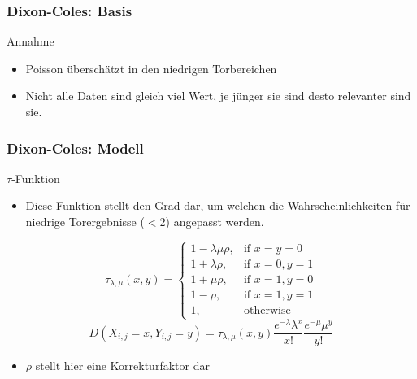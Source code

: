 \documentclass{beamer}
\begin{document}
    \begin{frame}
        \frametitle{Dixon-Coles: Basis}
        \begin{block}{Annahme}
            \begin{itemize}
                \item Poisson überschätzt in den niedrigen Torbereichen
                \item Nicht alle Daten sind gleich viel Wert, je jünger sie sind desto relevanter sind sie.
            \end{itemize}
        \end{block}
    \end{frame}
    \begin{frame}
        \frametitle{Dixon-Coles: Modell}
        \begin{block}{$\tau$-Funktion}
            \begin{itemize}
                \item Diese Funktion stellt den Grad dar, um welchen die Wahrscheinlichkeiten für niedrige Torergebnisse ($<2$) angepasst werden.
            \end{itemize}
            \[
                \tau_{\lambda,\mu}(x, y) =
                \begin{cases}
                    1 - \lambda\mu\rho, &\text{if } x = y = 0\\
                    1 + \lambda\rho, &\text{if } x = 0, y = 1\\
                    1 + \mu\rho, &\text{if } x = 1, y = 0\\
                    1 - \rho, &\text{if } x = 1, y = 1\\
                    1, &\text{otherwise}
                \end{cases}
            \]\vspace{.3cm}\[
                D(X_{i,j} = x, Y_{i,j} = y) =
                \tau_{\lambda,\mu}(x, y)
                \frac{e^{-\lambda}\lambda^{x}}{x!} \frac{e^{-\mu}\mu^{y}}{y!}
            \]
            \begin{itemize}
                \item $\rho$ stellt hier eine Korrekturfaktor dar
            \end{itemize}
        \end{block}
    \end{frame}
\end{document}
